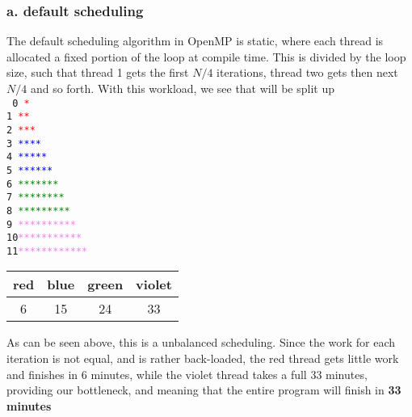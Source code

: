 \documentclass[titlepage]{article}
\def\code#1{\texttt{#1}}
\begin{document}
\subsubsection*{a. default scheduling}
The default scheduling algorithm in OpenMP is static, where each thread is
allocated a fixed portion of the loop at compile time. This is divided by
the loop size, such that thread 1 gets the first $N/4$ iterations, thread
two gets then next $N/4$ and so forth. With this workload, we see that will
be split up\\
\code{
0 \textcolor{red}   {*}\\
1 \textcolor{red}   {**}\\
2 \textcolor{red}   {***}\\
3 \textcolor{blue}  {****}\\
4 \textcolor{blue}  {*****}\\
5 \textcolor{blue}  {******}\\
6 \textcolor{green} {*******}\\
7 \textcolor{green} {********}\\
8 \textcolor{green} {*********}\\
9 \textcolor{violet}{**********}\\
10\textcolor{violet}{***********}\\
11\textcolor{violet}{************}
}
\begin{center}
    \begin{tabular}{|c|c|c|c|}
        \hline
        red&blue&green&violet \\
        \hline
        6 & 15 & 24 & 33 \\
        \hline
    \end{tabular}
\end{center}
As can be seen above, this is a unbalanced scheduling. Since the work for
each iteration is not equal, and is rather back-loaded, the red thread gets
little work and finishes in 6 minutes, while the violet thread takes a full
33 minutes, providing our bottleneck, and meaning that the entire program
will finish in \textbf{33 minutes}
\end{document}
